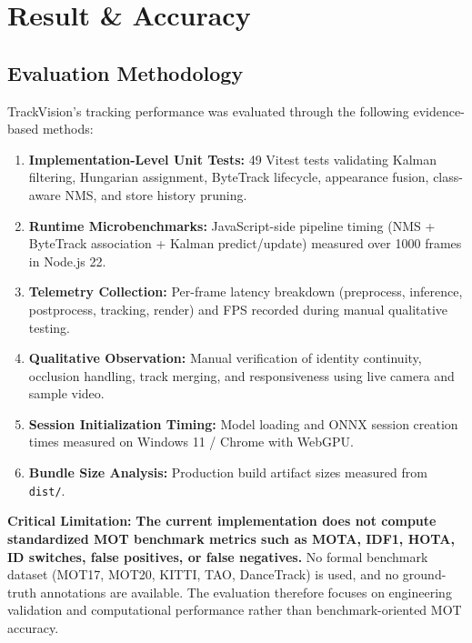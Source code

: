 \chapter{Result \& Accuracy}
\label{ch:results}

\section{Evaluation Methodology}
\label{sec:eval-method}

TrackVision's tracking performance was evaluated through the following evidence-based methods:

\begin{enumerate}
    \item \textbf{Implementation-Level Unit Tests:} 49 Vitest tests validating Kalman filtering, Hungarian assignment, ByteTrack lifecycle, appearance fusion, class-aware NMS, and store history pruning.
    \item \textbf{Runtime Microbenchmarks:} JavaScript-side pipeline timing (NMS + ByteTrack association + Kalman predict/update) measured over 1000 frames in Node.js 22.
    \item \textbf{Telemetry Collection:} Per-frame latency breakdown (preprocess, inference, postprocess, tracking, render) and FPS recorded during manual qualitative testing.
    \item \textbf{Qualitative Observation:} Manual verification of identity continuity, occlusion handling, track merging, and responsiveness using live camera and sample video.
    \item \textbf{Session Initialization Timing:} Model loading and ONNX session creation times measured on Windows 11 / Chrome with WebGPU.
    \item \textbf{Bundle Size Analysis:} Production build artifact sizes measured from \texttt{dist/}.
\end{enumerate}

\vspace{0.3cm}

\noindent \textbf{Critical Limitation:} \textbf{The current implementation does not compute standardized MOT benchmark metrics such as MOTA, IDF1, HOTA, ID switches, false positives, or false negatives.} No formal benchmark dataset (MOT17, MOT20, KITTI, TAO, DanceTrack) is used, and no ground-truth annotations are available. The evaluation therefore focuses on engineering validation and computational performance rather than benchmark-oriented MOT accuracy.

